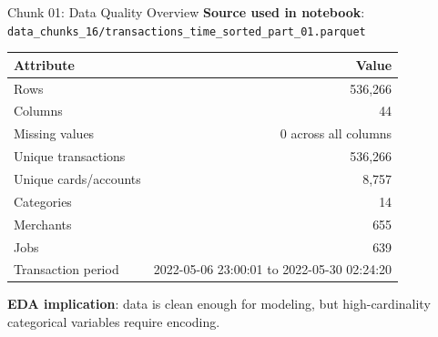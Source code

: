 \documentclass{beamer}
\begin{document}
\begin{frame}{Chunk 01: Data Quality Overview}
    \textbf{Source used in notebook}: \texttt{data\_chunks\_16/transactions\_time\_sorted\_part\_01.parquet}

    \vspace{0.25cm}
    \begin{table}
        \centering
        \small
        \begin{tabular}{l r}
            \toprule
            \textbf{Attribute} & \textbf{Value} \\
            \midrule
            Rows & 536,266 \\
            Columns & 44 \\
            Missing values & 0 across all columns \\
            Unique transactions & 536,266 \\
            Unique cards/accounts & 8,757 \\
            Categories & 14 \\
            Merchants & 655 \\
            Jobs & 639 \\
            Transaction period & 2022-05-06 23:00:01 to 2022-05-30 02:24:20 \\
            \bottomrule
        \end{tabular}
    \end{table}

    \vspace{0.15cm}
    \textbf{EDA implication}: data is clean enough for modeling, but high-cardinality categorical variables require encoding.
\end{frame}
\end{document}
